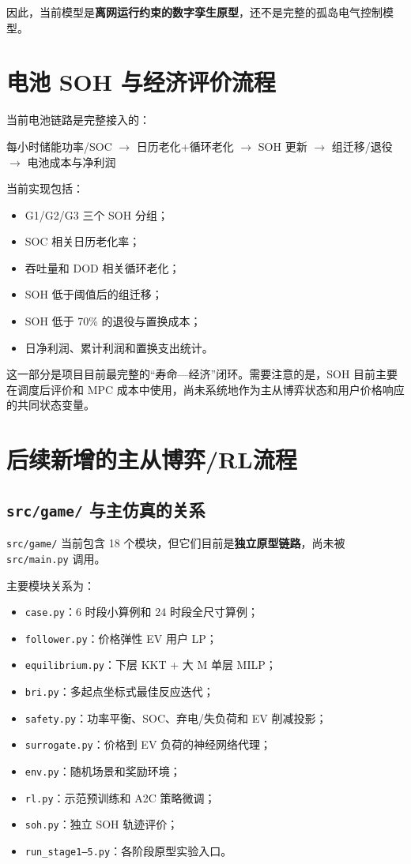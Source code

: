 \documentclass[UTF8,a4paper,11pt]{ctexart}
\begin{document}
因此，当前模型是\textbf{离网运行约束的数字孪生原型}，还不是完整的孤岛电气控制模型。

\section{电池 SOH 与经济评价流程}

当前电池链路是完整接入的：

\begin{center}
\small
每小时储能功率/SOC
$\rightarrow$
日历老化+循环老化
$\rightarrow$
SOH 更新
$\rightarrow$
组迁移/退役
$\rightarrow$
电池成本与净利润
\end{center}

当前实现包括：

\begin{itemize}
  \item G1/G2/G3 三个 SOH 分组；
  \item SOC 相关日历老化率；
  \item 吞吐量和 DOD 相关循环老化；
  \item SOH 低于阈值后的组迁移；
  \item SOH 低于 70\% 的退役与置换成本；
  \item 日净利润、累计利润和置换支出统计。
\end{itemize}

这一部分是项目目前最完整的“寿命—经济”闭环。需要注意的是，SOH 目前主要在调度后评价和 MPC 成本中使用，尚未系统地作为主从博弈状态和用户价格响应的共同状态变量。

\section{后续新增的主从博弈/RL流程}

\subsection{\texttt{src/game/} 与主仿真的关系}

\texttt{src/game/} 当前包含 18 个模块，但它们目前是\textbf{独立原型链路}，尚未被 \texttt{src/main.py} 调用。

主要模块关系为：

\begin{itemize}
  \item \texttt{case.py}：6 时段小算例和 24 时段全尺寸算例；
  \item \texttt{follower.py}：价格弹性 EV 用户 LP；
  \item \texttt{equilibrium.py}：下层 KKT + 大 M 单层 MILP；
  \item \texttt{bri.py}：多起点坐标式最佳反应迭代；
  \item \texttt{safety.py}：功率平衡、SOC、弃电/失负荷和 EV 削减投影；
  \item \texttt{surrogate.py}：价格到 EV 负荷的神经网络代理；
  \item \texttt{env.py}：随机场景和奖励环境；
  \item \texttt{rl.py}：示范预训练和 A2C 策略微调；
  \item \texttt{soh.py}：独立 SOH 轨迹评价；
  \item \texttt{run\_stage1--5.py}：各阶段原型实验入口。
\end{itemize}
\end{document}
